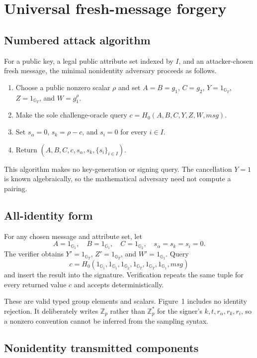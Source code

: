 \documentclass[10pt,a4paper]{article}
\newcommand{\Zp}{\mathbb{Z}_p}
\newcommand{\gone}{\mathbb{G}_1}
\newcommand{\gtwo}{\mathbb{G}_2}
\newcommand{\gthree}{\mathbb{G}_T}
\newcommand{\oneone}{1_{\gone}}
\newcommand{\onetwo}{1_{\gtwo}}
\newcommand{\onethree}{1_{\gthree}}
\begin{document}
\section{Universal fresh-message forgery}

\subsection{Numbered attack algorithm}

For a public key, a legal public attribute set indexed by $I$, and an
attacker-chosen fresh message, the minimal nonidentity adversary proceeds as
follows.
\begin{enumerate}
  \item Choose a public nonzero scalar $\rho$ and set
        $A=B=g_1$, $C=g_2$, $Y=\onethree$, $Z=\onethree$, and
        $W=g_1^\rho$.
  \item Make the sole challenge-oracle query
        $c=H_0(A,B,C,Y,Z,W,\mathit{msg})$.
  \item Set $s_\alpha=0$, $s_k=\rho-c$, and $s_i=0$ for every $i\in I$.
  \item Return $(A,B,C,c,s_\alpha,s_k,\{s_i\}_{i\in I})$.
\end{enumerate}
This algorithm makes no key-generation or signing query. The cancellation
$Y=1$ is known algebraically, so the mathematical adversary need not compute a
pairing.

\subsection{All-identity form}

For any chosen message and attribute set, let
\[
A=\oneone,\quad B=\oneone,\quad C=\onetwo,
\quad s_\alpha=s_k=s_i=0.
\]
The verifier obtains $Y'=\onethree$, $Z'=\onethree$, and $W'=\oneone$.
Query
\[
c=H_0(\oneone,\oneone,\onetwo,\onethree,\onethree,
      \oneone,\mathit{msg})
\]
and insert the result into the signature. Verification repeats the same tuple
for every returned value $c$ and accepts deterministically.

These are valid typed group elements and scalars. Figure~1 includes no
identity rejection. It deliberately writes $\Zp$ rather than $\Zp^*$ for the
signer's $k,t,r_\alpha,r_k,r_i$, so a nonzero convention cannot be inferred
from the sampling syntax.

\subsection{Nonidentity transmitted components}
\end{document}
